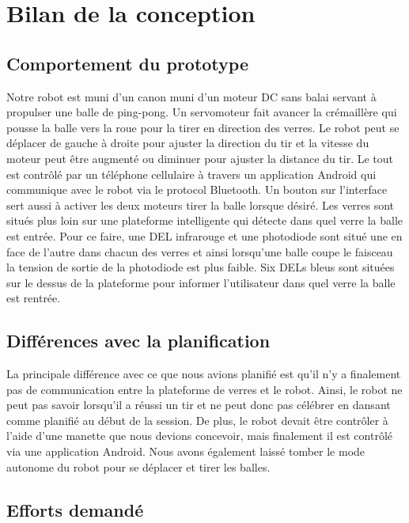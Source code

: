 \section{Bilan de la conception}


\subsection{Comportement du prototype}

Notre robot est muni d’un canon muni d’un moteur DC sans balai servant à propulser une balle de ping-pong.
Un servomoteur fait avancer la crémaillère qui pousse la balle vers la roue pour la tirer en direction des verres.
Le robot peut se déplacer de gauche à droite pour ajuster la direction du tir et la vitesse du moteur peut être augmenté ou diminuer pour ajuster la distance du tir.
Le tout est contrôlé par un téléphone cellulaire à travers un application Android qui communique avec le robot via le protocol Bluetooth.
Un bouton sur l’interface sert aussi à activer les deux moteurs tirer la balle lorsque désiré.
Les verres sont situés plus loin sur une plateforme intelligente qui détecte dans quel verre la balle est entrée.
Pour ce faire, une DEL infrarouge et une photodiode sont situé une en face de l’autre dans chacun des verres et ainsi lorsqu’une balle coupe le faisceau la tension de sortie de la photodiode est plus faible.
Six DELs bleus sont situées sur le dessus de la plateforme pour informer l’utilisateur dans quel verre la balle est rentrée.

\subsection{Différences avec la planification}

La principale différence avec ce que nous avions planifié est qu’il n’y a finalement pas de communication entre la plateforme de verres et le robot.
Ainsi, le robot ne peut pas savoir lorsqu’il a réussi un tir et ne peut donc pas célébrer en dansant comme planifié au début de la session.
De plus, le robot devait être contrôler à l’aide d’une manette que nous devions concevoir, mais finalement il est contrôlé via une application Android.
Nous avons également laissé tomber le mode autonome du robot pour se déplacer et tirer les balles.

\subsection{Efforts demandé}


